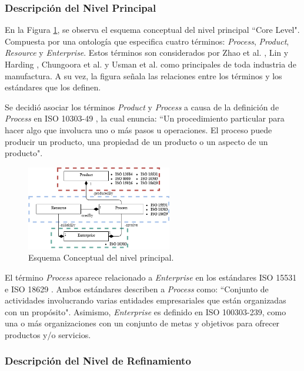 \documentclass[journal]{IEEEtran}
\begin{document}
\subsubsection{Descripci\'on del Nivel Principal}

En la Figura \ref{fig3}, se observa el esquema conceptual del nivel principal ``Core Level". Compuesta por una ontolog\'ia que especifica cuatro t\'erminos: \emph{Process}, \emph{Product}, \emph{Resource} y \emph{Enterprise}. Estos t\'erminos son considerados por Zhao et al. \cite{Zhao1999}, Lin y Harding \cite{Lin2007},  Chungoora et al. \cite{Chungoora2013c} y Usman et al. \cite{Usman2013} como principales de toda industria de manufactura. A su vez, la figura señala las relaciones entre los t\'erminos y los est\'andares que los definen.

Se decidi\'o asociar los t\'erminos \emph{Product} y \emph{Process} a causa de la definici\'on de \emph{Process} en ISO 10303-49 \cite{ISOProperties}, la cual enuncia: ``Un procedimiento particular para hacer algo que involucra uno o m\'as pasos u operaciones. El proceso puede producir un producto, una propiedad de un producto o un aspecto de un producto". 

\begin{figure}[!t]
\centering
\includegraphics[width=2.5in]{figures/figure3.png}
\caption{Esquema Conceptual del nivel principal.}
\label{fig3}
\end{figure}

El t\'ermino \emph{Process} aparece relacionado a \emph{Enterprise} en los est\'andares ISO 15531 \cite{ISO2004} e ISO 18629 \cite{ISOPrinciplesc}. Ambos est\'andares describen a \emph{Process} como: ``Conjunto de actividades involucrando varias entidades empresariales que est\'an organizadas con un prop\'osito". Asimismo, \emph{Enterprise} es definido en ISO 100303-239, como una o m\'as organizaciones con un conjunto de metas y objetivos para ofrecer productos y/o servicios.

\subsubsection{Descripción del Nivel de Refinamiento}
\end{document}
